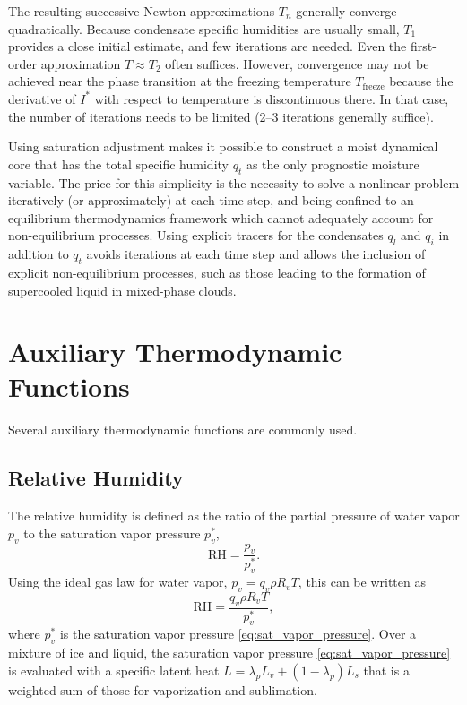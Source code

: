\documentclass{report}
\begin{document}
The resulting successive Newton approximations $T_n$ generally converge quadratically. Because condensate specific humidities are usually small, $T_1$ provides a close initial estimate, and few iterations are needed. Even the first-order approximation $T\approx T_2$ often suffices. However, convergence may not be achieved near the phase transition at the freezing temperature $T_{\mathrm{freeze}}$ because the derivative of $I^*$ with respect to temperature is discontinuous there. In that case, the number of iterations needs to be limited (2--3 iterations generally suffice). 

Using saturation adjustment makes it possible to construct a moist dynamical core that has the total specific humidity $q_t$ as the only prognostic moisture variable. The price for this simplicity is the necessity to solve a nonlinear problem iteratively (or approximately) at each time step, and being confined to an equilibrium thermodynamics framework which cannot adequately account for non-equilibrium processes. Using explicit tracers for the condensates $q_l$ and $q_i$ in addition to $q_t$ avoids iterations at each time step and allows the inclusion of explicit non-equilibrium processes, such as those leading to the formation of supercooled liquid in mixed-phase clouds. 

\section{Auxiliary Thermodynamic Functions}

Several auxiliary thermodynamic functions are commonly used. 

\subsection{Relative Humidity} 

The relative humidity is defined as the ratio of the partial pressure of water vapor $p_v$ to the saturation vapor pressure $p_v^*$,
\[
\mathrm{RH} = \frac{p_v}{p_v^*}.
\]
Using the ideal gas law for water vapor, $p_v = q_v \rho R_v T$, this can be written as
\begin{equation}
    \mathrm{RH} = \frac{q_v \rho R_v T}{p_v^*},
\end{equation}
where $p_v^*$ is the saturation vapor pressure \eqref{eq:sat_vapor_pressure}. Over a mixture of ice and liquid, the saturation vapor pressure \eqref{eq:sat_vapor_pressure} is evaluated with a specific latent heat $L = \lambda_p L_v + (1-\lambda_p) L_s$ that is a weighted sum of those for vaporization and sublimation.
\end{document}
